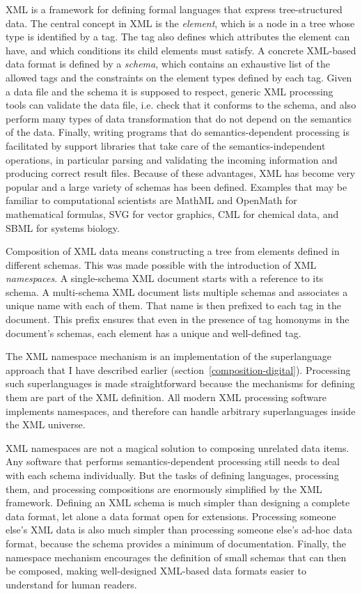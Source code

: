 XML \cite{_extensible_1998} is a framework for defining formal languages that express tree-structured data. The central concept in XML is the \textit{element}, which is a node in a tree whose type is identified by a tag. The tag also defines which attributes the element can have, and which conditions its child elements must satisfy. A concrete XML-based data format is defined by a \textit{schema}, which contains an exhaustive list of the allowed tags and the constraints on the element types defined by each tag. Given a data file and the schema it is supposed to respect, generic XML processing tools can validate the data file, i.e. check that it conforms to the schema, and also perform many types of data transformation that do not depend on the semantics of the data. Finally, writing programs that do semantics-dependent processing is facilitated by support libraries that take care of the semantics-independent operations, in particular parsing and validating the incoming information and producing correct result files. Because of these advantages, XML has become very popular and a large variety of schemas has been defined. Examples that may be familiar to computational scientists are MathML and OpenMath for mathematical formulas, SVG for vector graphics, CML for chemical data, and SBML for systems biology.

Composition of XML data means constructing a tree from elements defined in different schemas. This was made possible with the introduction of XML \textit{namespaces}. A single-schema XML document starts with a reference to its schema. A multi-schema XML document lists multiple schemas and associates a unique name with each of them. That name is then prefixed to each tag in the document. This prefix ensures that even in the presence of tag homonyms in the document's schemas, each element has a unique and well-defined tag.

The XML namespace mechanism is an implementation of the superlanguage approach that I have described earlier (section~\ref{composition-digital}). Processing such superlanguages is made straightforward because the mechanisms for defining them are part of the XML definition. All modern XML processing software implements namespaces, and therefore can handle arbitrary superlanguages inside the XML universe.

XML namespaces are not a magical solution to composing unrelated data items. Any software that performs semantics-dependent processing still needs to deal with each schema individually. But the tasks of defining languages, processing them, and processing compositions are enormously simplified by the XML framework. Defining an XML schema is much simpler than designing a complete data format, let alone a data format open for extensions. Processing someone else's XML data is also much simpler than processing someone else's ad-hoc data format, because the schema provides a minimum of documentation. Finally, the namespace mechanism encourages the definition of small schemas that can then be composed, making well-designed XML-based data formats easier to understand for human readers.

